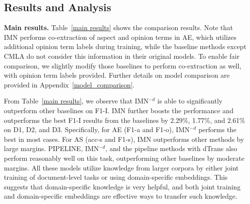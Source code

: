 \documentclass[11pt,a4paper]{article}
\begin{document}
\subsection{Results and Analysis}
\textbf{Main results.} 
Table~\ref{main results} shows the comparison results.
Note that IMN performs co-extraction of aspect and opinion terms in AE, which utilizes additional opinion term labels during training, while the baseline methods except CMLA do not consider this information in their original models. To enable fair comparison, we slightly modify those baselines to perform co-extraction as well, with opinion term labels provided. Further details on model comparison are provided in Appendix~\ref{model_comparison}.

 From Table~\ref{main results}, we observe that IMN$^{-d}$ is able to significantly outperform other baselines on F1-I. IMN further boosts the performance and outperforms the best F1-I results from the baselines by 2.29\%, 1.77\%, and 2.61\%  on D1, D2, and D3.
 Specifically, for AE (F1-a and F1-o), IMN$^{-d}$ performs the best in most cases.
For AS (acc-s and F1-s), IMN outperforms other methods by large margins. PIPELINE, IMN$^{-d}$, and the pipeline methods with dTrans also perform reasonably well on this task, outperforming other baselines by moderate margins. All these models utilize knowledge from larger corpora by either joint training of document-level tasks or using domain-specific embeddings. This suggests that domain-specific knowledge is very helpful, and both joint training and domain-specific embeddings are effective ways to transfer such knowledge. 
 
 
\renewcommand{\arraystretch}{1.2}
\begin{table}[t]
\centering
\small
{}
\caption{F1-I scores of different model variants. Average results over 5 runs are reported.}\label{ablation test}
\end{table}
\end{document}
